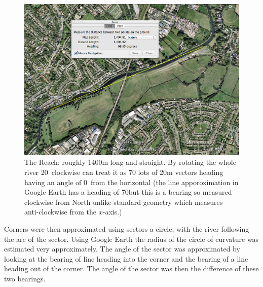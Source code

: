       \begin{figure}[h]
      \begin{center}
        \includegraphics[scale=0.3]{images/TheReach.png}
        \caption{The Reach: roughly 1400m long and straight. By rotating the whole river 20\textdegree \ clockwise can treat it as 70 lots of 20m vectors heading having an angle of 0\textdegree \ from the horizontal (the line apporoximation in Google Earth has a heading of 70\textdegree but this is a bearing so measured clockwise from North unlike standard geometry which measures anti-clockwise from the $x$-axis.)}
        \label{fig:thereach}
      \end{center}
      \end{figure}
      
      Corners were then approximated using sectors a circle, with the river following the arc of the sector. Using Google Earth the radius of the circle of curvature was estimated very approximately. The angle of the sector was approximated by looking at the bearing of line heading into the corner and the bearing of a line heading out of the corner. The angle of the sector was then the difference of these two bearings.
      
